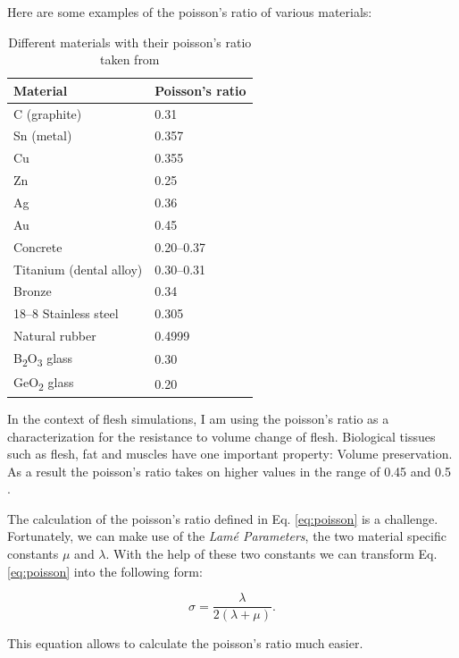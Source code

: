 Here are some examples of the poisson's ratio of various materials:

\begin{table}[!htbp]
\centering
    \begin{tabular}{ | l | l |}
    \hline
    \textbf{Material} & \textbf{Poisson's ratio} \\ \hline
    C (graphite) & 0.31 \\ \hline
    Sn (metal) & 0.357 \\ \hline
    Cu & 0.355 \\ \hline
    Zn & 0.25 \\ \hline
    Ag & 0.36 \\ \hline
    Au & 0.45 \\ \hline
    Concrete & 0.20–0.37 \\ \hline
    Titanium (dental alloy) & 0.30–0.31 \\ \hline
    Bronze & 0.34 \\ \hline
    18–8 Stainless steel & 0.305 \\ \hline
    Natural rubber & 0.4999 \\ \hline
	B\textsubscript{2}O\textsubscript{3} glass & 0.30 \\ \hline
	GeO\textsubscript{2} glass & 0.20 \\ \hline	
    \end{tabular}
    \caption{Different materials with their poisson's ratio taken from \cite{PhysRevB.80.132104}}
\label{table:1}
\end{table}

In the context of flesh simulations, I am using the poisson's ratio as a characterization for the resistance to volume change of flesh. Biological tissues such as flesh, fat and muscles have one important property: Volume preservation. As a result the poisson's ratio takes on higher values in the range of 0.45 and 0.5 \cite{Smith:2018:SNF:3191713.3180491}.

The calculation of the poisson's ratio defined in Eq. \ref{eq:poisson} is a challenge. Fortunately, we can make use of the \textit{Lamé Parameters}, the two material specific constants $\mu$ and $\lambda$. With the help of these two constants we can transform Eq. \ref{eq:poisson} into the following form:

\begin{equation}\label{eq:poisson_ratio}
\sigma =  \frac{\lambda}{2(\lambda + \mu)}.
\end{equation}

This equation allows to calculate the poisson's ratio much easier. 

